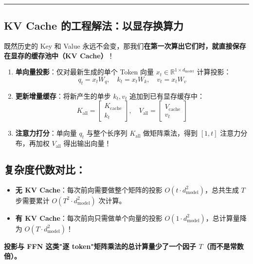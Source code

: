 \vspace{0.8em}\hrule\vspace{0.8em}

\subsection{KV Cache 的工程解法：以显存换算力}

既然历史的 Key 和 Value 永远不会变，那我们\textbf{在第一次算出它们时，就直接保存在显存的缓存池中（KV Cache）}！

\begin{mathBox}
\begin{enumerate}
  \item \textbf{单向量投影}：仅对最新生成的单个 Token 向量 $x_t \in \mathbb{R}^{1 \times d_{\mathrm{model}}}$ 计算投影：
  \[
  q_t = x_t W_q, \quad k_t = x_t W_k, \quad v_t = x_t W_v
  \]
  \item \textbf{更新增量缓存}：将新产生的单步 $k_t, v_t$ 追加到已有显存缓存中：
  \[
  K_{\mathrm{all}} = \begin{bmatrix} K_{\mathrm{cache}} \\ k_t \end{bmatrix}, \quad V_{\mathrm{all}} = \begin{bmatrix} V_{\mathrm{cache}} \\ v_t \end{bmatrix}
  \]
  \item \textbf{注意力打分}：单向量 $q_t$ 与整个长序列 $K_{\mathrm{all}}$ 做矩阵乘法，得到 $[1, t]$ 注意力分布，再加权 $V_{\mathrm{all}}$ 得出输出向量！
\end{enumerate}
\end{mathBox}

\subsection{复杂度代数对比：}

\begin{itemize}
  \item \textbf{无 KV Cache}：每次前向需要做整个矩阵的投影 $O(t \cdot d_{\text{model}}^2)$，总共生成 $T$ 步需要累计 $O(T^2 \cdot d_{\text{model}}^2)$ 次计算。
  \item \textbf{有 KV Cache}：每次前向只需做单个向量的投影 $O(1 \cdot d_{\text{model}}^2)$，总计算量降为 $O(T \cdot d_{\text{model}}^2)$！
\end{itemize}

\textbf{投影与 FFN 这类"逐 token"矩阵乘法的总计算量少了一个因子 $T$（而不是常数倍）。}

